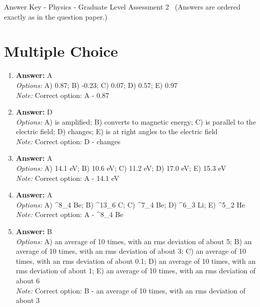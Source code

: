 \documentclass[12pt]{article}
\begin{document}
\begin{center}
Answer Key - Physics - Graduate Level Assessment 2 \
\small (Answers are ordered exactly as in the question paper.)
\end{center}

\section*{Multiple Choice}
\begin{enumerate}[label=\arabic*.]
\item \textbf{Answer:} A
\\ \textit{Options:} A) 0.87; B) -0.23; C) 0.07; D) 0.57; E) 0.97
\\ \textit{Note:} Correct option: A - 0.87
\item \textbf{Answer:} D
\\ \textit{Options:} A) is amplified; B) converts to magnetic energy; C) is parallel to the electric field; D) changes; E) is at right angles to the electric field
\\ \textit{Note:} Correct option: D - changes
\item \textbf{Answer:} A
\\ \textit{Options:} A) 14.1 eV; B) 10.6 eV; C) 11.2 eV; D) 17.0 eV; E) 15.3 eV
\\ \textit{Note:} Correct option: A - 14.1 eV
\item \textbf{Answer:} A
\\ \textit{Options:} A) ^8\_4 Be; B) ^13\_6 C; C) ^7\_4 Be; D) ^6\_3 Li; E) ^5\_2 He
\\ \textit{Note:} Correct option: A - ^8\_4 Be
\item \textbf{Answer:} B
\\ \textit{Options:} A) an average of 10 times, with an rms deviation of about 5; B) an average of 10 times, with an rms deviation of about 3; C) an average of 10 times, with an rms deviation of about 0.1; D) an average of 10 times, with an rms deviation of about 1; E) an average of 10 times, with an rms deviation of about 6
\\ \textit{Note:} Correct option: B - an average of 10 times, with an rms deviation of about 3
\end{enumerate}
\end{document}
